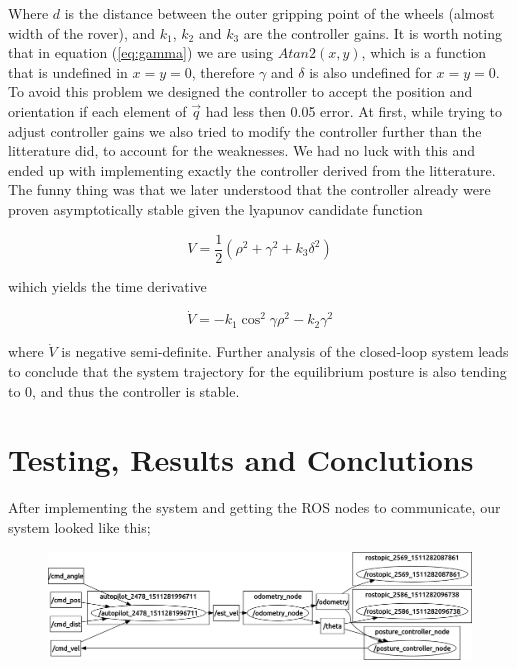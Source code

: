 \documentclass[a4paper,10pt]{article}
\begin{document}
		Where $d$ is the distance between the outer gripping point of the wheels (almost width of the rover), and $k_{1}$, $k_{2}$ and $k_{3}$ are the controller gains.
		It is worth noting that in equation (\ref{eq:gamma}) we are using $Atan2(x,y)$, which is a function that is undefined in $x=y=0$, therefore $\gamma$ and $\delta$ is also undefined for $x=y=0$.
		To avoid this problem we designed the controller to accept the position and orientation if each element of $\vec{q}$ had less then 0.05 error. At first, while trying to adjust controller gains 
		we also tried to modify the controller further than the litterature did, to account for the weaknesses. We had no luck with this and ended up with implementing exactly the controller
		derived from the litterature. The funny thing was that we later understood that the controller already were proven asymptotically stable given the lyapunov candidate function

		\begin{equation}
			V = \frac{1}{2}(\rho^2 + \gamma^2 + k_{3}\delta^2)
		\end{equation}

		wihich yields the time derivative

		\begin{equation}
			\dot{V} = - k_{1}\cos^2{\gamma}  \rho^2 - k_{2}\gamma^2
		\end{equation}

		where $\dot{V}$ is negative semi-definite. Further analysis of the closed-loop system leads to conclude that the system trajectory for the equilibrium posture is also tending to 0, 
		and thus the controller is stable.

		\vspace{10mm}

\section{Testing, Results and Conclutions}

		After implementing the system and getting the ROS nodes to communicate, our system looked like this;

		\begin{figure}[H]
		\centering
		\includegraphics[width=1\textwidth,height=0.2\textheight]{rover2_rqt_graph.png}
 		\label{fig:rqtgraph}
		\end{figure}
\end{document}
